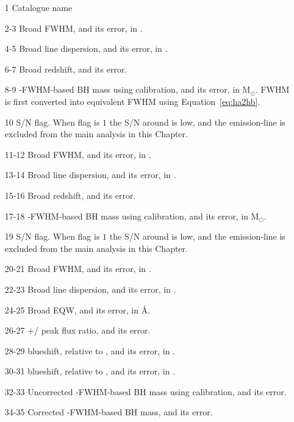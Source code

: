 \begin{itemize}

 \item[1] Catalogue name

 \item[2-3] Broad \ha FWHM, and its error, in \kms.

 \item[4-5] Broad \ha line dispersion, and its error, in \kms.

 \item[6-7] Broad \ha redshift, and its error. 

 \item[8-9] \hans-FWHM-based BH mass using \citet{vestergaard06} calibration, and its error, in M$_\odot$. \ha FWHM is first converted into equivalent \hb FWHM using Equation~\ref{eq:ha2hb}. 

 \item[10] \ha S/N flag. When flag is $1$ the S/N around \ha is low, and the emission-line is excluded from the main analysis in this Chapter. 

 \item[11-12] Broad \hb FWHM, and its error, in \kms.

 \item[13-14] Broad \hb line dispersion, and its error, in \kms.

 \item[15-16] Broad \hb redshift, and its error. 

 \item[17-18] \hbns-FWHM-based BH mass using \citet{vestergaard06} calibration, and its error, in M$_\odot$.  

 \item[19] \hb S/N flag. When flag is $1$ the S/N around \hb is low, and the emission-line is excluded from the main analysis in this Chapter. 

 \item[20-21] Broad  FWHM, and its error, in \kms.

 \item[22-23] Broad  line dispersion, and its error, in \kms.

 \item[24-25] Broad  EQW, and its error, in \AA.

 \item[26-27] +/ peak flux ratio, and its error.

 \item[28-29]  blueshift, relative to \hans, and its error, in \kms.

 \item[30-31]  blueshift, relative to \hbns, and its error, in \kms.

 \item[32-33] Uncorrected -FWHM-based BH mass using \citet{vestergaard06} calibration, and its error.

 \item[34-35] Corrected -FWHM-based BH mass, and its error.

\end{itemize}


